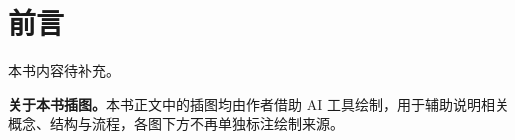 \chapter*{前言}

本书内容待补充。

\bigskip
\noindent\textbf{关于本书插图。}本书正文中的插图均由作者借助 AI 工具绘制，用于辅助说明相关概念、结构与流程，各图下方不再单独标注绘制来源。
